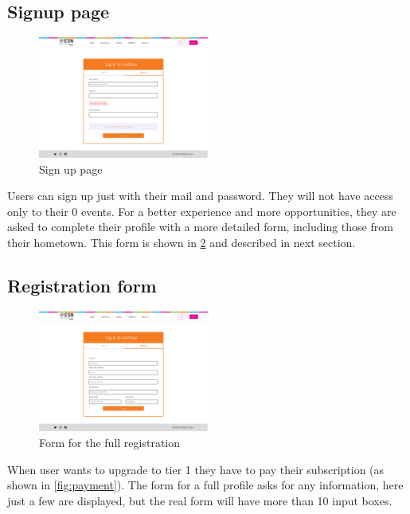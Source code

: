 \subsection{Signup page}
\begin{figure}[H]
    \centering
    \includegraphics[width=0.5\textwidth]{images/signup.png}
    \caption{Sign up page}
    \label{fig:signup page}
\end{figure}
Users can sign up just with their mail and password. They will not have access only to their
0 events. For a better experience and more opportunities,
they are asked to complete their profile with a more detailed form, including those from
their hometown. This form is shown in \ref{fig:form} and described in next section.
\subsection{Registration form}
\begin{figure}[H]
    \centering
    \includegraphics[width=0.5\textwidth]{images/form.png}
    \caption{Form for the full registration}
    \label{fig:form}
\end{figure}
When user wants to upgrade to tier 1 they have to pay their subscription (as shown in \ref{fig:payment}).
The form for a full profile asks for any information, here just a few are displayed, but the 
real form will have more than 10 input boxes. 
